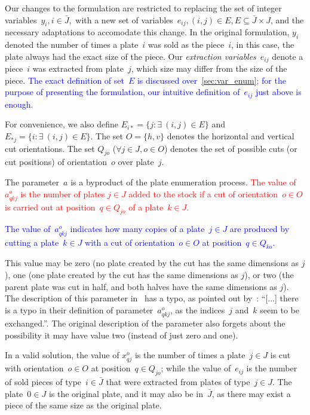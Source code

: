 \documentclass[ppgc,tese,english,formais,babel]{iiufrgs}
\newif\iffinalversion
\newcommand{\newtext}[1]{\iffinalversion%
#1%
\else%
\textcolor{blue}{#1}%
\fi%
}
\newcommand{\oldtext}[1]{\iffinalversion%
\else%
\textcolor{red}{#1}%
\fi%
}
\begin{document}
Our changes to the formulation are restricted to replacing the set of integer variables~\(y_i, i \in \bar{J},\) with a new set of variables~\(e_{ij}, (i, j) \in E, E \subseteq \bar{J} \times J\), and the necessary adaptations to accomodate this change.
In the original formulation, \(y_i\) denoted the number of times a plate~\(i\) was sold as the piece~\(i\), in this case, the plate always had the exact size of the piece.
Our \emph{extraction variables}~\(e_{ij}\) denote a piece~\(i\) was extracted from plate~\(j\), which size may differ from the size of the piece.
\newtext{The exact definition of set~\(E\) is discussed over~\cref{sec:var_enum}; for the purpose of presenting the formulation, our intuitive definition of~\(e_{ij}\) just above is enough.}
For convenience, we also define \(E_{i*} = \{ j : \exists~(i, j) \in E \}\) and \(E_{*j} = \{i : \exists~(i, j) \in E \}\).
The set \(O = \{h, v\}\) denotes the horizontal and vertical cut orientations.
The set \(Q_{jo}\) (\(\forall j \in J, o \in O\)) denotes the set of possible cuts (or cut positions) of orientation~\(o\) over plate~\(j\).

The parameter~\(a\) is a byproduct of the plate enumeration process.
\oldtext{The value of \(a^o_{qkj}\) is the number of plates \(j \in J\) added to the stock if a cut of orientation~\(o \in O\) is carried out at position~\(q \in Q_{jo}\) of a plate~\(k \in J\).}
\newtext{The value of~\(a^o_{qkj}\) indicates how many copies of a plate~\(j \in J\) are produced by cutting a plate~\(k \in J\) with a cut of orientation~\(o \in O\) at position~\(q \in Q_{ko}\).}
This value may be zero (no plate created by the cut has the same dimensions as \(j\)), one (one plate created by the cut has the same dimensions as \(j\)), or two (the parent plate was cut in half, and both halves have the same dimensions as \(j\)).
The description of this parameter in~\citet{furini:2016} has a typo, as pointed out by~\citet{martin:2020}:
``[...] there is a typo in their definition of parameter~\(a^o_{qkj}\), as the indices~\(j\) and~\(k\) seem to be exchanged.''.
The original description of the parameter also forgets about the possibility it may have value two (instead of just zero and one).

In a valid solution, the value of \(x^o_{qj}\) is the number of times a plate~\(j \in J\) is cut with orientation~\(o \in O\) at position~\(q \in Q_{jo}\); while the value of~\(e_{ij}\) is the number of sold pieces of type~\(i \in \bar{J}\) that were extracted from plates of type~\(j \in J\).
The plate~\(0 \in J\) is the original plate, and it may also be in~\(\bar{J}\), as there may exist a piece of the same size as the original plate.
\end{document}
